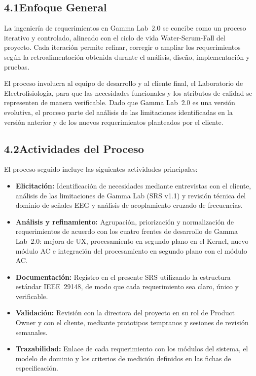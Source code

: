 \documentclass[12pt, letterpaper]{article}
\begin{document}
\subsection*{4.1\quad Enfoque General}

La ingeniería de requerimientos en Gamma Lab~2.0 se concibe como un proceso iterativo y
controlado, alineado con el ciclo de vida Water-Scrum-Fall del proyecto. Cada iteración permite refinar,
corregir o ampliar los requerimientos según la retroalimentación obtenida durante el análisis,
diseño, implementación y pruebas.

El proceso involucra al equipo de desarrollo y al cliente final, el Laboratorio de
Electrofisiología, para que las necesidades funcionales
y los atributos de calidad se representen de manera verificable. Dado que Gamma Lab~2.0 es
una versión evolutiva, el proceso parte del análisis de las limitaciones identificadas en la
versión anterior y de los nuevos requerimientos planteados por el cliente.

\subsection*{4.2\quad Actividades del Proceso}

El proceso seguido incluye las siguientes actividades principales:

\begin{itemize}[leftmargin=1.5em,itemsep=4pt]
  \item \textbf{Elicitación:} Identificación de necesidades mediante entrevistas con el
        cliente, análisis de las limitaciones de Gamma Lab (SRS v1.1) y revisión técnica
        del dominio de señales EEG y análisis de acoplamiento cruzado de frecuencias.
  \item \textbf{Análisis y refinamiento:} Agrupación, priorización y normalización de
        requerimientos de acuerdo con los cuatro frentes de desarrollo de Gamma Lab~2.0:
        mejora de UX, procesamiento en segundo plano en el Kernel, nuevo módulo AC e
        integración del procesamiento en segundo plano con el módulo AC.
  \item \textbf{Documentación:} Registro en el presente SRS utilizando la estructura
        estándar IEEE~29148, de modo que cada requerimiento sea claro, único y
        verificable.
  \item \textbf{Validación:} Revisión con la directora del proyecto en su rol de Product
        Owner y con el cliente, mediante prototipos tempranos y sesiones de revisión
        semanales.
  \item \textbf{Trazabilidad:} Enlace de cada requerimiento con los módulos del sistema,
        el modelo de dominio y los criterios de medición definidos en las fichas de
        especificación.
\end{itemize}
\end{document}
